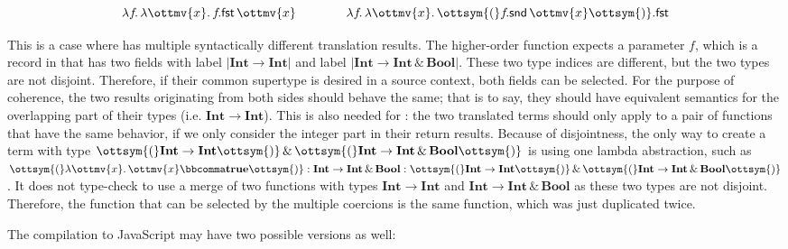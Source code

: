 \[
  \lambda f \! .\,  \lambda \ottmv{x} .\, f \!    . \mathsf{fst}  \, \ottmv{x} \qquad\qquad   \lambda f \! .\,  \lambda \ottmv{x} .\, \ottsym{(}   f \!  . \mathsf{snd}  \, \ottmv{x}  \ottsym{)}    . \mathsf{fst} 
\]

\noindent
This is a case where \lambdar has multiple syntactically different translation
results. The higher-order function expects a parameter $f$, which is a record in
\lambdar that has two fields with label $ |  \mathbf{Int}   \rightarrow   \mathbf{Int}  | $ and label
$ |  \mathbf{Int}   \rightarrow   \mathbf{Int}   \, {\&} \,   \mathbf{Bool}  | $. These two type indices are different, but the two types
are not disjoint. Therefore, if their common supertype is desired in a source
context, both fields can be selected. For the purpose of coherence, the two
results originating from both sides should behave the same; that is to say, they
should have equivalent semantics for the overlapping part of their types (i.e.
$ \mathbf{Int}   \rightarrow   \mathbf{Int} $). This is also needed for \lambdac: the two translated terms
should only apply to a pair of functions that have the same behavior, if we only
consider the integer part in their return results. Because of disjointness, the
only way to create a term with type $\ottsym{(}   \mathbf{Int}   \rightarrow   \mathbf{Int}   \ottsym{)}  \, {\&} \,  \ottsym{(}   \mathbf{Int}   \rightarrow   \mathbf{Int}   \, {\&} \,   \mathbf{Bool}   \ottsym{)}$ is
using one lambda abstraction, such as
$\ottsym{(}   \lambda \ottmv{x} .\, \ottmv{x}   \bbcomma   \mathbf{true}   \ottsym{)}  :   \mathbf{Int}   \rightarrow   \mathbf{Int}   \, {\&} \,   \mathbf{Bool}   :  \ottsym{(}   \mathbf{Int}   \rightarrow   \mathbf{Int}   \ottsym{)}  \, {\&} \,  \ottsym{(}   \mathbf{Int}   \rightarrow   \mathbf{Int}   \, {\&} \,   \mathbf{Bool}   \ottsym{)}$. It
does not type-check to use a merge of two functions with types  $ \mathbf{Int}   \rightarrow   \mathbf{Int} $
and $ \mathbf{Int}   \rightarrow   \mathbf{Int}   \, {\&} \,   \mathbf{Bool} $ as these two types are not disjoint. Therefore, the
function that can be selected by the multiple coercions is the same function,
which was just duplicated twice.

The compilation to JavaScript may have two possible versions as well:

